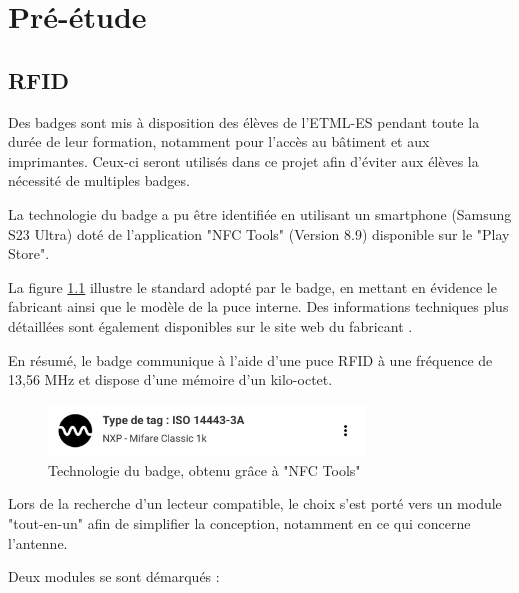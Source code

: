 \cleardoublepage

\chapter{Pré-étude}

\section{RFID}

Des badges sont mis à disposition des élèves de l'ETML-ES pendant toute la durée de leur formation, notamment pour l'accès au bâtiment et aux imprimantes. Ceux-ci seront utilisés dans ce projet afin d'éviter aux élèves la nécessité de multiples badges.

La technologie du badge a pu être identifiée en utilisant un smartphone (Samsung S23 Ultra) doté de l'application "NFC Tools" (Version 8.9) disponible sur le "Play Store".

La figure \ref{fig:screenshotnfctools} illustre le standard adopté par le badge, en mettant en évidence le fabricant ainsi que le modèle de la puce interne. Des informations techniques plus détaillées sont également disponibles sur le site web du fabricant \cite{MIFAREClassicEV1}.

En résumé, le badge communique à l'aide d'une puce RFID à une fréquence de 13,56 MHz et dispose d'une mémoire d'un kilo-octet.

\begin{figure}[h]
	\centering
	\includegraphics[width=0.75\textwidth]{2312_Images/2312_Pre-etude/Screenshot_NFC_Tools}
	\caption{Technologie du badge, obtenu grâce à "NFC Tools"}
	\label{fig:screenshotnfctools}
\end{figure}

Lors de la recherche d'un lecteur compatible, le choix s'est porté vers un module "tout-en-un" afin de simplifier la conception, notamment en ce qui concerne l'antenne.

\noindent
Deux modules se sont démarqués :

